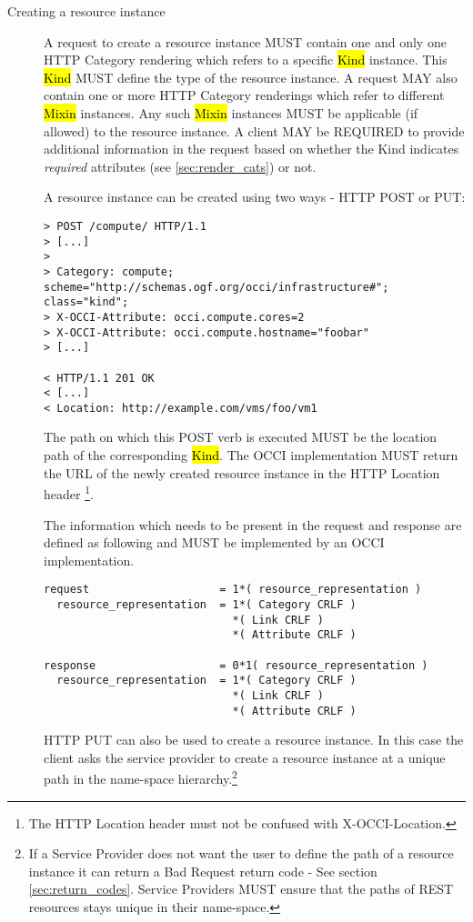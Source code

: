 \documentclass[10pt,a4paper]{article}
\begin{document}
\begin{description}
  \item[Creating a resource instance] A request to create a resource
    instance MUST contain one and only one HTTP Category rendering
    which refers to a specific \hl{Kind} instance. This \hl{Kind}
    MUST define the type of the resource instance.  A request 
    MAY also contain one or more HTTP Category
    renderings which refer to different \hl{Mixin} instances. Any such
    \hl{Mixin} instances MUST be applicable (if allowed) to the
    resource instance.  A client MAY be REQUIRED to provide additional
    information in the request based on whether the Kind indicates 
    \emph{required} attributes (see \ref{sec:render_cats}) or not.
    
    A resource instance can be created using two ways - HTTP POST
    or PUT:

\begin{verbatim}
> POST /compute/ HTTP/1.1
> [...]
> 
> Category: compute; scheme="http://schemas.ogf.org/occi/infrastructure#"; class="kind"; 
> X-OCCI-Attribute: occi.compute.cores=2
> X-OCCI-Attribute: occi.compute.hostname="foobar"
> [...]
 
< HTTP/1.1 201 OK
< [...]
< Location: http://example.com/vms/foo/vm1
\end{verbatim}

    The path on which this POST verb is executed MUST be the location
    path of the corresponding \hl{Kind}. The OCCI
    implementation MUST return the URL of the newly created
    resource instance in the HTTP Location header%
    \footnote{The HTTP Location header \cite{rfc2616} must not be confused with
    X-OCCI-Location.}.

    The information which needs to be present in the request and
    response are defined as following and MUST be implemented by an
    OCCI implementation.

\begin{verbatim}
request                    = 1*( resource_representation )
  resource_representation  = 1*( Category CRLF )
                             *( Link CRLF )
                             *( Attribute CRLF )

response                   = 0*1( resource_representation )
  resource_representation  = 1*( Category CRLF )
                             *( Link CRLF )
                             *( Attribute CRLF )
\end{verbatim}

    HTTP PUT can also be used to create a resource instance. In this
    case the client asks the service provider to create a resource
    instance at a unique path in the name-space hierarchy.\footnote{If
      a Service Provider does not want the user to define the path of
      a resource instance it can return a Bad Request return code -
      See section \ref{sec:return_codes}. Service Providers MUST
      ensure that the paths of REST resources stays unique in their
      name-space.}


\end{description}
\end{document}
